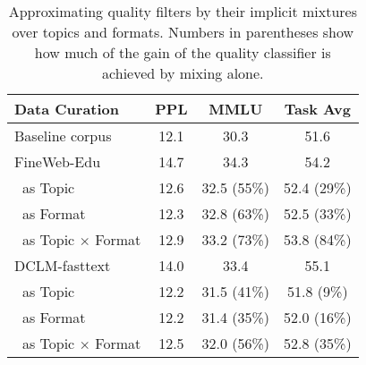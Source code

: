 \ificml
\begin{table}[t]
    \centering
    \vskip -0.03in
    \caption{Approximating quality filters by their implicit mixtures over topics and formats. Numbers in parentheses show how much of the gain of the quality classifier is achieved by mixing alone.}
    \icmlskip{0.05in}
    \begin{tabular}{lccc}
        \toprule
        \textbf{Data Curation} & {PPL} & {MMLU} & {Task Avg} \\
        \midrule
        Baseline corpus & 12.1 & 30.3 & 51.6 \\
        \midrule
        FineWeb-Edu & 14.7 & 34.3 & 54.2 \\
        \cmidrule(lr){2-4}
        $\;\;${as Topic} & 12.6 & 32.5 {\scriptsize (55\%)} & 52.4 {\scriptsize (29\%)} \\
        $\;\;${as Format} & 12.3 & 32.8 {\scriptsize (63\%)} & 52.5 {\scriptsize (33\%)} \\
        $\;\;${as Topic $\times$ Format} & 12.9 & 33.2 {\scriptsize (73\%)}  & 53.8 {\scriptsize (84\%)} \\
        \midrule
        DCLM-fasttext & 14.0 & 33.4 & 55.1 \\
        \cmidrule(lr){2-4}
        $\;\;${as Topic} & 12.2 & 31.5 {\scriptsize (41\%)} & 51.8 {\scriptsize (9\%)\phantom{0}} \\
        $\;\;${as Format} & 12.2 & 31.4 {\scriptsize (35\%)} & 52.0 {\scriptsize (16\%)} \\
        $\;\;${as Topic $\times$ Format} & 12.5 & 32.0 {\scriptsize (56\%)} & 52.8 {\scriptsize (35\%)} \\
        \bottomrule
    \end{tabular}
    \icmlskip{-0.1in}
    \label{tab:results_quality}
\end{table}
\else
    \centering
    \vskip -0.03in
    \icmlskip{0.05in}
    \small
